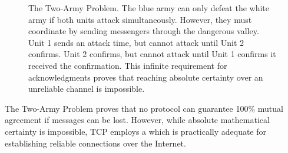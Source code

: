\begin{figure}[htbp]
    \centering
    \caption{The Two-Army Problem. The blue army can only defeat the white army if both units attack simultaneously. However, they must coordinate by sending messengers through the dangerous valley. Unit 1 sends an attack time, but cannot attack until Unit 2 confirms. Unit 2 confirms, but cannot attack until Unit 1 confirms it received the confirmation. This infinite requirement for acknowledgments proves that reaching absolute certainty over an unreliable channel is impossible.}
    \label{fig:two_army}
\end{figure}

The Two-Army Problem proves that no protocol can guarantee 100\% mutual agreement if messages can be lost. However, while absolute mathematical certainty is impossible, TCP employs a  which is practically adequate for establishing reliable connections over the Internet.

